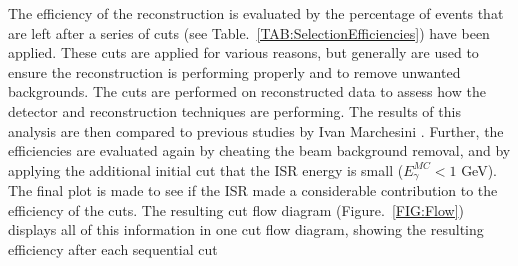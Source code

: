 The efficiency of the reconstruction is evaluated by the percentage of events that are left after a series of cuts (see Table.~\ref{TAB:SelectionEfficiencies}) have been applied. These cuts are applied for various reasons, but generally are used to ensure the reconstruction is performing properly and to remove unwanted backgrounds. The cuts are performed on reconstructed data to assess how the detector and reconstruction techniques are performing. The results of this analysis are then compared to previous studies by Ivan Marchesini  \cite{Marchesini:2011aka}. Further, the efficiencies are evaluated again by cheating the beam background removal, and by applying the additional initial cut that the ISR energy is small (${E}_{\gamma}^{MC} < 1$ GeV). The final plot is made to see if the ISR made a considerable contribution to the efficiency of the cuts. The resulting cut flow diagram (Figure.~\ref{FIG:Flow}) displays all of this information in one cut flow diagram, showing the resulting efficiency after each sequential cut
\\\\
